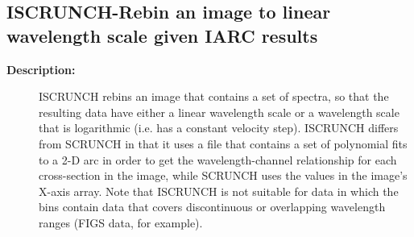 \subsection{ISCRUNCH-\label{ISCRUNCH}Rebin an image to linear wavelength scale given IARC results}
\begin{description}

\item [{\bf Description:}]
 ISCRUNCH rebins an image that contains a set of spectra, so that
 the resulting data have either a linear wavelength scale or a
 wavelength scale that is logarithmic (i.e. has a constant velocity
 step).  ISCRUNCH differs from SCRUNCH in that it uses a file that
 contains a set of polynomial fits to a 2-D arc in order to get the
 wavelength-channel relationship for each cross-section in the
 image, while SCRUNCH uses the values in the image's X-axis array.
 Note that ISCRUNCH is not suitable for data in which the bins
 contain data that covers discontinuous or overlapping wavelength
 ranges (FIGS data, for example).


\end{description}
